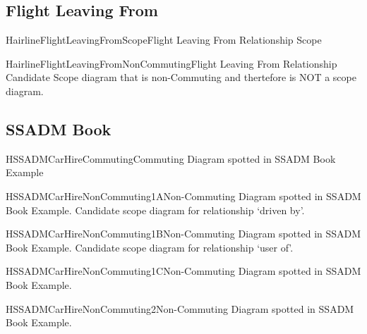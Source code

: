 \subsection{Flight Leaving From}
\begin{erboxedFigure}{H}{airlineFlightLeavingFromScope}{Flight Leaving From Relationship Scope}

\end{erboxedFigure}

\begin{erboxedFigure}{H}{airlineFlightLeavingFromNonCommuting}{Flight Leaving From Relationship Candidate Scope diagram that is non-Commuting and thertefore is NOT a scope diagram.}

\end{erboxedFigure}

\subsection{SSADM Book}
\begin{erboxedFigure}{H}{SSADMCarHireCommuting}{Commuting Diagram spotted in SSADM Book Example}

\end{erboxedFigure}

\begin{erboxedFigure}{H}{SSADMCarHireNonCommuting1A}{Non-Commuting Diagram spotted in SSADM Book Example. Candidate scope diagram for relationship `driven by'.}

\end{erboxedFigure}

\begin{erboxedFigure}{H}{SSADMCarHireNonCommuting1B}{Non-Commuting Diagram spotted in SSADM Book Example. Candidate scope diagram for relationship `user of'.}

\end{erboxedFigure}

\begin{erboxedFigure}{H}{SSADMCarHireNonCommuting1C}{Non-Commuting Diagram spotted in SSADM Book Example. }

\end{erboxedFigure}

\begin{erboxedFigure}{H}{SSADMCarHireNonCommuting2}{Non-Commuting Diagram spotted in SSADM Book Example. }

\end{erboxedFigure}

